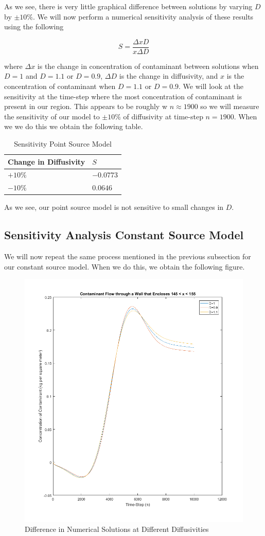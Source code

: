 \documentclass[a4paper]{article}
\theoremstyle{remark}
\theoremstyle{remark}
\begin{document}
\noindent As we see, there is very little graphical difference between solutions by varying $D$ by $\pm 10\%$. We will now perform a numerical sensitivity analysis of these results using the following

\begin{equation}
S=\frac{\Delta x D}{x \Delta D}
\end{equation}

\noindent where $\Delta x$ is the change in concentration of contaminant between solutions when $D=1$ and $D=1.1$ or $D=0.9$, $\Delta D$ is the change in diffusivity, and $x$ is the concentration of contaminant when $D=1.1$ or $D=0.9$. We will look at the sensitivity at the time-step where the most concentration of contaminant is present in our region. This appears to be roughly w $n \approx 1900$ so we will measure the sensitivity of our model to $\pm 10\%$ of diffusivity at time-step $n=1900$. When we we do this we obtain the following table.


\begin{table}[H]
\centering
\caption{Sensitivity Point Source Model}
\label{sensitivitymodel1}
\begin{tabular}{|l|l|}
\hline
Change in Diffusivity           & $S$ \\ \hline
$+10\%$    & $-0.0773$              \\ \hline
$-10\%$   & $0.0646$              \\ \hline
\end{tabular}
\end{table}
\noindent As we see, our point source model is not sensitive to small changes in $D$.


\subsection{Sensitivity Analysis Constant Source Model}  \label{SensitivityAnalysisConstantSourceSection}
We will now repeat the same process mentioned in the previous subsection for our constant source model. When we do this, we obtain the following figure.

\begin{figure}[H]   
\centering   
   \includegraphics[trim=0mm 0mm 0mm 0mm,clip,width=0.5\linewidth]{senseconst.png}
    \caption{Difference in Numerical Solutions at Different Diffusivities}
    \label{senseconst}
\end{figure}
\end{document}
